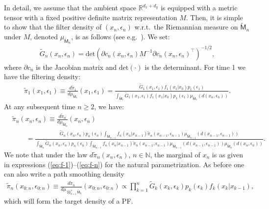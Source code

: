 \documentclass[english,13pt]{article}
\numberwithin{equation}{section}
\begin{document}
In detail, we assume that the ambient space $\mathbb{R}^{d_x+d_y}$ is equipped with a metric tensor with a fixed positive definite matrix representation $M$. Then, it is simple to show that the filter density 
of $(x_n,\epsilon_n)$ w.r.t.~the Riemannian measure on $\widetilde{\mathsf{M}}_n$ under $M$, denoted $\mu_{\widetilde{\mathsf{M}}_n}$,
is as follows (see e.g.~\cite{zhu}).  We set:
%
\begin{align}
\label{eq:Gram-e}
\widetilde{G}_n(x_n,\epsilon_n) = \textrm{det}(\partial c_n(x_n,\epsilon_n)M^{-1}\partial c_n(x_n,\epsilon_n)^{\top})^{-1/2},
\end{align}
%
where $\partial c_n$ is the Jacobian matrix and $\textrm{det}(\cdot)$ is the determinant.
For time 1 we have the filtering density:
%
\begin{align*}
\widetilde{\pi}_1(x_1,\epsilon_1) \equiv \frac{d\widetilde{\pi}_1}{d\mu_{\widetilde{\mathsf{M}}_1}}(x_1,\epsilon_1)  =   \frac{
\widetilde{G}_1(x_1,\epsilon_1)f_1(x_1|x_0)p_1(\epsilon_1)}{
\int_{\widetilde{\mathsf{M}}_1}
\widetilde{G}_1(x_1,\epsilon_1)f_1(x_1|x_0)p_1(\epsilon_1)
\mu_{\widetilde{\mathsf{M}}_1}(d(x_n,\epsilon_n))
}.
\end{align*}
%
At any subsequent time $n\geq 2$, we have:
%
\begin{align*}
&\widetilde{\pi}_n(x_n,\epsilon_n) \equiv \frac{d\widetilde{\pi}_n}{d\mu_{\widetilde{\mathsf{M}}_n}}(x_n,\epsilon_n)    \\ 
 &\qquad = \frac{
\widetilde{G}_n(x_n,\epsilon_n)p_n(\epsilon_n) \int_{\widetilde{\mathsf{M}}_{n-1} } f_n(x_n|x_{n-1})
\widetilde{\pi}_n(x_{n-1},\epsilon_{n-1}) \mu_{\widetilde{\mathsf{M}}_{n-1}}(d(x_{n-1},\epsilon_{n-1}))
}{
\int_{\widetilde{\mathsf{M}}_n}
\widetilde{G}_n(x_n,\epsilon_n)p_n(\epsilon_n) \int_{\widetilde{\mathsf{M}}_{n-1} } f_n(x_n|x_{n-1})
\widetilde{\pi}_n(x_{n-1},\epsilon_{n-1}) \mu_{\widetilde{\mathsf{M}}_{n-1}}(d(x_{n-1},\epsilon_{n-1}))
\mu_{\widetilde{\mathsf{M}}_n}(d(x_n,\epsilon_n))
}.
\end{align*}
%
We note that under the law $d\widetilde{\pi}_n(x_n, \epsilon_n)$, $n\in \mathbb{N}$,  the marginal  of $x_n$ is as given in  expressions (\ref{eq:f-1})--(\ref{eq:f-n}) for the natural parametrization. As before one can also write a path smoothing density
\begin{align}
\widetilde{\pi}_n(x_{0:n},\epsilon_{0:n}) \equiv \frac{d\widetilde{\pi}_n}{d\mu_{\bigotimes_{k=1}^n \widetilde{\mathsf{M}}_k}}(x_{0:n},\epsilon_{0:n})    \propto 
\prod_{k=1}^n \widetilde{G}_k(x_k,\epsilon_k)p_k(\epsilon_k)  f_k(x_k|x_{k-1}),
\label{eq:smoothing_M_n_low_noise}
\end{align}
which will form the target density of a PF.
\end{document}
